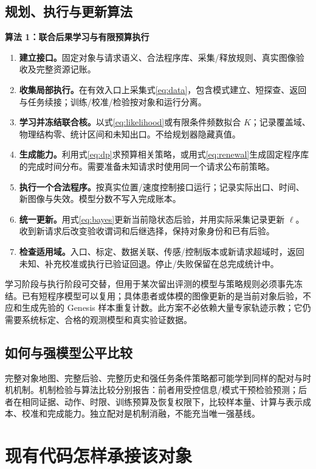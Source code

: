\documentclass[11pt,a4paper,fontset=fandol]{ctexart}
\theoremstyle{definition}
\theoremstyle{remark}
\numberwithin{equation}{section}
\begin{document}
\subsection{规划、执行与更新算法}
\begin{corebox}
\textbf{算法 1：联合后果学习与有限预算执行}
\begin{enumerate}
\item \textbf{建立接口。}固定对象与请求语义、合法程序库、采集/释放规则、真实图像验收及完整资源记账。
\item \textbf{收集局部执行。}在有效入口上采集式\eqref{eq:data}，包含模式建立、短探查、返回与任务续接；训练/校准/检验按对象和运行分离。
\item \textbf{学习并冻结联合核。}以式\eqref{eq:likelihood}或有限条件频数拟合 $K$；记录覆盖域、物理结构零、统计区间和未知出口。不给规划器隐藏真值。
\item \textbf{生成能力。}利用式\eqref{eq:dp}求预算相关策略，或用式\eqref{eq:renewal}生成固定程序库的完成时间分布。需要准备未知请求时使用同一个请求公布前策略。
\item \textbf{执行一个合法程序。}按真实位置/速度控制接口运行；记录实际出口、时间、新图像与失效。模型分数不写入完成账本。
\item \textbf{统一更新。}用式\eqref{eq:bayes}更新当前隐状态后验，并用实际采集记录更新 $\ell$。收到新请求后改变验收谓词和后继选择，保持对象身份和已有后验。
\item \textbf{检查适用域。}入口、标定、数据关联、传感/控制版本或新请求超域时，返回未知、补充校准或执行已验证回退。停止/失败保留在总完成统计中。
\end{enumerate}
\end{corebox}

学习阶段与执行阶段可交替，但用于某次留出评测的模型与策略规则必须事先冻结。已有短程序模型可以复用；具体患者或体模的图像更新的是当前对象后验，不应和生成先验的 Genesis 样本重复计数。此方案不必依赖大量专家轨迹示教；它仍需要系统标定、合格的观测模型和真实验证数据。

\subsection{如何与强模型公平比较}
完整对象地图、完整后验、完整历史和强任务条件策略都可能学到同样的配对与时机机制。机制检验与算法比较分别报告：前者用受控信息/模式干预检验预测；后者在相同证据、动作、时限、训练预算及恢复权限下，比较样本量、计算与表示成本、校准和完成能力。独立配对是机制消融，不能充当唯一强基线。

\section{现有代码怎样承接该对象}
\label{sec:implementation}
\end{document}
